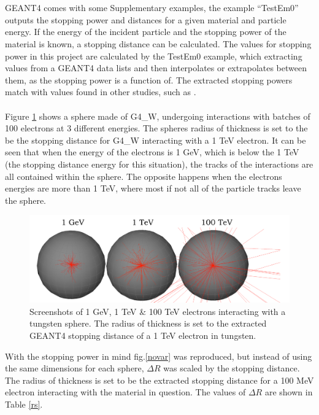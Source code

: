 \documentclass[12pt,a4paper]{article}
\begin{document}
\\\\
\noindent GEANT4 comes with some Supplementary examples, the example ``TestEm0'' \cite{emo} outputs the stopping power and distances for a given material and particle energy. If the energy of the incident particle and the stopping power of the material is known, a stopping distance can be calculated. The values for stopping power in this project are calculated by the TestEm0 example, which extracting values from a GEANT4 data lists and then interpolates or extrapolates between them, as the stopping power is a function of. The extracted stopping powers match with values found in other studies, such as \cite{stpdat}.
\\\\
Figure \ref{tung} shows a sphere made of G4\_W, undergoing interactions with batches of 100 electrons at 3 different energies. The spheres radius of thickness is set to the be the stopping distance for G4\_W interacting with a 1 TeV electron. It can be seen that when the energy of the electrons is 1 GeV, which is below the 1 TeV (the stopping distance energy for this situation), the tracks of the interactions are all contained within the sphere. The opposite happens when the electrons energies are more than 1 TeV, where most if not all of the particle tracks leave the sphere. 

\begin{figure}[h!]
\hspace*{1.4cm}\includegraphics[scale=0.5]{Images//BDSIM//Tungsten_Sphere.png}
\caption[width=\columnwidth]{Screenshots of 1 GeV, 1 TeV \& 100 TeV electrons interacting with a tungsten sphere. The radius of thickness is set to the extracted GEANT4 stopping distance of a 1 TeV electron in tungsten.}
\label{tung}
\end{figure}

\noindent With the stopping power in mind fig.\ref{novar} was reproduced, but instead of using the same dimensions for each sphere, $\Delta R$ was scaled by the stopping distance. The radius of thickness is set to be the extracted stopping distance for a 100 MeV electron interacting with the material in question. The values of $\Delta R$ are shown in Table \ref{rs}.
\end{document}
